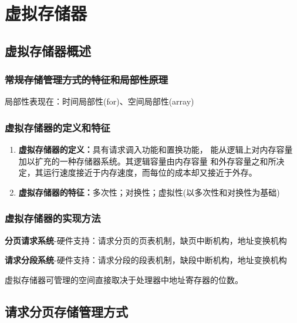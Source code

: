 \documentclass{article}
\begin{document}
\clearpage
\section{虚拟存储器}
\subsection{虚拟存储器概述}
\subsubsection{\sout{常规存储管理方式的特征和局部性原理}}
局部性表现在：时间局部性(for)、空间局部性(array)
\subsubsection{\color{red}虚拟存储器的定义和特征}
\begin{enumerate}
    \item \textbf{虚拟存储器的定义：}具有请求调入功能和置换功能，
    能从逻辑上对内存容量加以扩充的一种存储器系统。其逻辑容量由内存容量
    和外存容量之和所决定，其运行速度接近于内存速度，而每位的成本却又接近于外存。
    \item \textbf{虚拟存储器的特征：}多次性；对换性；虚拟性(以多次性和对换性为基础)
\end{enumerate}

\subsubsection{虚拟存储器的实现方法}
\textbf{分页请求系统}-硬件支持：请求分页的页表机制，缺页中断机构，地址变换机构

\textbf{请求分段系统}-硬件支持：请求分段的段表机制，缺段中断机构，地址变换机构

{\color{green}虚拟存储器可管理的空间直接取决于处理器中地址寄存器的位数。}

\subsection{请求分页存储管理方式}
\end{document}
